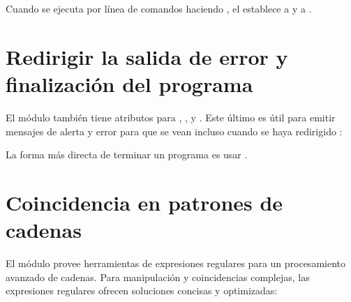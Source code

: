 \documentclass[a4,10pt,spanish]{sphinxmanual}
\begin{document}
\sphinxAtStartPar
Cuando se ejecuta por línea de comandos haciendo , el  establece  a  y  a .


\section{Redirigir la salida de error y finalización del programa}
\label{\detokenize{tutorial/stdlib:error-output-redirection-and-program-termination}}\label{\detokenize{tutorial/stdlib:tut-stderr}}
\sphinxAtStartPar
El módulo  también tiene atributos para , , y .  Este último es útil para emitir mensajes de alerta y error para que se vean incluso cuando se haya redirigido :

\begin{sphinxVerbatim}[commandchars=\\\{\}]
\end{sphinxVerbatim}

\sphinxAtStartPar
La forma más directa de terminar un programa es usar .


\section{Coincidencia en patrones de cadenas}
\label{\detokenize{tutorial/stdlib:string-pattern-matching}}\label{\detokenize{tutorial/stdlib:tut-string-pattern-matching}}
\sphinxAtStartPar
El módulo  provee herramientas de expresiones regulares para un procesamiento avanzado de cadenas.  Para manipulación y coincidencias complejas, las expresiones regulares ofrecen soluciones concisas y optimizadas:
\end{document}
